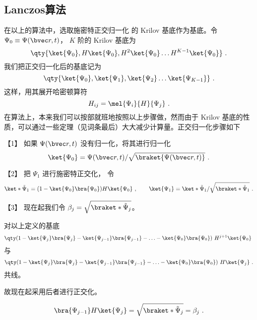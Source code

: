 \subsection{Lanczos算法}
在以上的算法中，选取施密特正交归一化 %
的 Krilov 基底作为基底。令 $\Psi_0 \equiv \Psi(\bvec r, t)$，  $K$ 阶的 Krilov 基底为
 \begin{equation}
\qty{ \ket{\Psi_0}, H \ket{\Psi_0}, H^2 \ket{\Psi_0} \dots H^{K-1} \ket{\Psi_0}}~.
\end{equation}
我们把正交归一化后的基底记为
\begin{equation}
\qty{ \ket{\Psi_0}, \ket{\Psi_1}, \ket{\Psi_2} \dots \ket{\Psi_{K-1}} }~.
\end{equation}
这样，用其展开哈密顿算符
\begin{equation}
H_{ij}=\mel{\Psi_i}{H}{\Psi_j}~.
\end{equation}
在算法上，本来我们可以按部就班地按照以上步骤做，然而由于 Krilov 基底的性质，可以通过一些定理（见词条最后）大大减少计算量。正交归一化步骤如下

【1】 如果 $\Psi(\bvec r,t)$ 没有归一化，将其进行归一化
\begin{equation}
\ket{\Psi_0}=\Psi(\bvec r,t)/\sqrt{\braket{\Psi(\bvec r,t)}}~.
\end{equation}

【2】 把 $\Psi_1$ 进行施密特正交化， 令
\begin{equation}\label{eq_Lanc_31}
\ket*{\tilde\Psi_1} = (1 - \ket{\Psi_0}\bra{\Psi_0})H \ket{\Psi_0}~,
\qquad
\ket{\Psi_1}=\ket*{\tilde\Psi_1}/\sqrt{\braket*{\tilde\Psi_1}}~.
\end{equation}

【3】 现在起我们令 $\beta_j = \sqrt{\braket*{\tilde\Psi_j}}$。 %

\begin{theorem}{}
对以上定义的基底
\begin{equation}
\qty(1 - \ket{\Psi_j} \bra{\Psi_j} - \ket{\Psi_{j - 1}} \bra{\Psi_{j - 1}} - \ldots - \ket{\Psi_0} \bra{\Psi_0})\ H^{j + 1} \ket{\Psi_0}~
\end{equation}
与
\begin{equation}
\qty( 1 - \ket{\Psi_j}\bra{\Psi_j} - \ket{\Psi_{j - 1}}\bra{\Psi_{j - 1}} - \ldots - \ket{\Psi_0}\bra{\Psi_0})\ H \ket{\Psi_j}~.
\end{equation}
共线。
\end{theorem}

故现在起采用后者进行正交化。

\begin{theorem}{}
\begin{equation}
\bra{\Psi_{j-1}} H \ket{\Psi_j}  = \sqrt{\braket*{\tilde\Psi_j}} = \beta_j~.
\end{equation}
\end{theorem}

